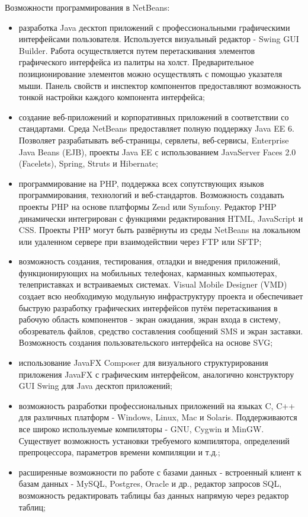 Возможности программирования в NetBeans:
\begin{itemize}
\item разработка Java десктоп приложений с профессиональными графическими интерфейсами пользователя. Используется визуальный редактор - Swing GUI Builder. Работа осуществляется путем перетаскивания элементов графического интерфейса из палитры на холст. Предварительное позиционирование элементов можно осуществлять с помощью указателя мыши. Панель свойств и инспектор компонентов предоставляют возможность тонкой настройки каждого компонента интерфейса; 
\item создание веб-приложений и корпоративных приложений в соответствии со стандартами. Среда NetBeans предоставляет полную поддержку Java EE 6. Позволяет разрабатывать веб-страницы, сервлеты, веб-сервисы, Enterprise Java Beans (EJB), проекты Java EE с использованием JavaServer Faces 2.0 (Facelets), Spring, Struts и Hibernate;
\item программирование на PHP, поддержка всех сопутствующих языков программирования, технологий и веб-стандартов. Возможность создавать проекты PHP на основе платформы Zend или Symfony. Редактор PHP динамически интегрирован с функциями редактирования HTML, JavaScript и CSS. Проекты PHP могут быть развёрнуты из среды NetBeans на локальном или удаленном сервере при взаимодействии через FTP или SFTP;
\item возможность создания, тестирования, отладки и внедрения приложений, функционирующих на мобильных телефонах, карманных компьютерах, телеприставках и встраиваемых системах. Visual Mobile Designer (VMD) создает всю необходимую модульную инфраструктуру проекта и обеспечивает быструю разработку графических интерфейсов путём перетаскивания в рабочую область компонентов - экран ожидания, экран входа в систему, обозреватель файлов, средство составления сообщений SMS и экран заставки. Возможность создания пользовательского интерфейса на основе SVG;
\item использование JavaFX Composer для визуального структурирования приложения JavaFX с графическим интерфейсом, аналогично конструктору GUI Swing для Java десктоп приложений;
\item возможность разработки профессиональных приложений на языках C, C++ для различных платформ - Windows, Linux, Mac и Solaris. Поддерживаются все широко используемые компиляторы - GNU, Cygwin и MinGW. Существует возможность установки требуемого компилятора, определений препроцессора, параметров времени компиляции и т.д.;
\item расширенные возможности по работе с базами данных - встроенный клиент к базам данных - MySQL, Postgres, Oracle и др., редактор запросов SQL, возможность редактировать таблицы баз данных напрямую через редактор таблиц;

\end{itemize}
